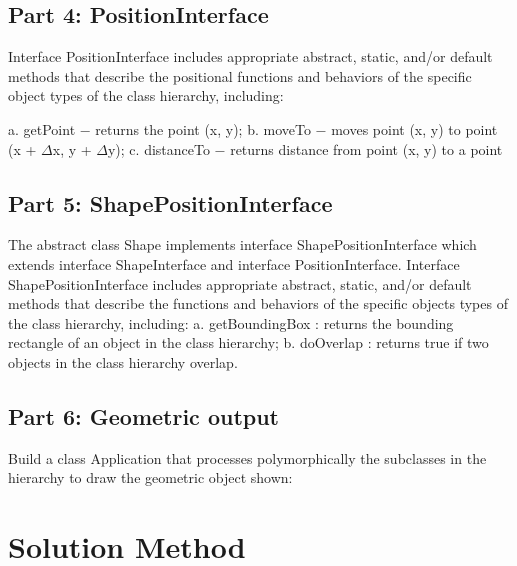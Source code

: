 \documentclass[a4paper,12pt]{article}
\begin{document}
\subsection{Part 4: PositionInterface}

Interface PositionInterface includes appropriate abstract, static, and/or default
methods that describe the positional functions and behaviors of the specific object types of the class hierarchy, including: \newpage

a. getPoint $-$ returns the point (x, y); \newline
b. moveTo $- $ moves point (x, y) to point (x + $\Delta$x, y + $\Delta$y); \newline
c. distanceTo $-$ returns distance from point (x, y) to a point 	\newline

\subsection{Part 5: ShapePositionInterface}

The abstract class Shape implements interface ShapePositionInterface which extends interface ShapeInterface and interface PositionInterface. Interface ShapePositionInterface includes appropriate abstract, static, and/or default methods that describe the functions and behaviors of the specific objects types of the class hierarchy, including: \newline
a. getBoundingBox : returns the bounding rectangle of an object in the class \newline 
hierarchy;
b. doOverlap : returns true if two objects in the class hierarchy overlap. \newline 


\subsection{Part 6: Geometric output}
Build a class Application that processes polymorphically the subclasses in the hierarchy to draw the geometric object shown:

\newpage
\section{Solution Method}
\end{document}
